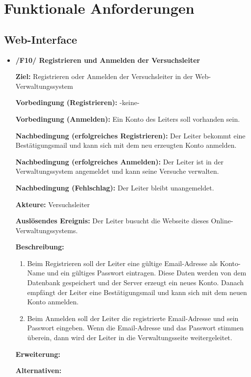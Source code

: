 \documentclass[a4paper]{scrreprt}
\begin{document}
    \chapter{Funktionale Anforderungen}

        \section{\gls{Web-Interface}}
            \begin{itemize}
                \item \textbf{/F10/ Registrieren und Anmelden der \gls{Versuchsleiter}}

                    \par \textbf{Ziel: }Registrieren oder Anmelden der \gls{Versuchsleiter} in der Web-Verwaltungssystem
                    \par \textbf{Vorbedingung (Registrieren): }-keine-
                    \par \textbf{Vorbedingung (Anmelden): }Ein Konto des Leiters soll vorhanden sein.
                    \par \textbf{Nachbedingung (erfolgreiches Registrieren): }Der Leiter bekommt eine Bestätigungsmail und kann sich mit dem neu erzeugten Konto anmelden.
                    \par \textbf{Nachbedingung (erfolgreiches Anmelden): }Der Leiter ist in der Verwaltungssystem angemeldet und kann seine Versuche verwalten.
                    \par \textbf{Nachbedingung (Fehlschlag): }Der Leiter bleibt unangemeldet.
                    \par \textbf{Akteure: }\gls{Versuchsleiter}
                    \par \textbf{Auslösendes Ereignis: }Der Leiter busucht die Webseite dieses Online-Verwaltungssystems.
                    \par \textbf{Beschreibung: }
                        \begin{enumerate}
                            \item Beim Registrieren soll der Leiter eine gültige Email-Adresse als Konto-Name und ein gültiges Passwort eintragen. Diese Daten werden von dem Datenbank gespeichert und der Server erzeugt ein neues Konto. Danach empfängt der Leiter eine Bestätigungsmail und kann sich mit dem neuen Konto anmelden.
                            \item Beim Anmelden soll der Leiter die registrierte Email-Adresse und sein Passwort eingeben. Wenn die Email-Adresse und das Passwort stimmen überein, dann wird der Leiter in die Verwaltungsseite weitergeleitet.
                        \end{enumerate}
                    \par \textbf{Erweiterung: }
                    \par \textbf{Alternativen: }



\end{itemize}
\end{document}
